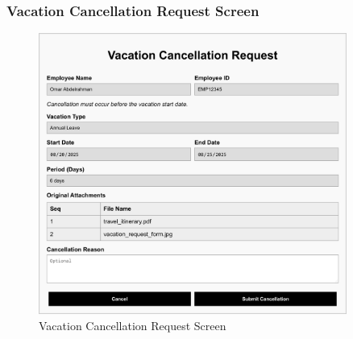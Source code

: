 \documentclass[12pt,a4paper]{article}
\begin{document}
\subsubsection{Vacation Cancellation Request Screen}
\begin{figure}[H]
\centering
\includegraphics[width=0.9\textwidth]{Wireframes/Vacation-Cancellation-Request/Vacation-Cancellation-Request-1.png}
\caption{Vacation Cancellation Request Screen}
\label{fig:vacation-cancellation-screen}
\end{figure}
\end{document}
